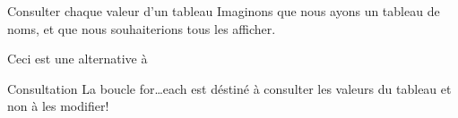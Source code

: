\begin{frame}{Consulter chaque valeur d'un tableau}
    Imaginons que nous ayons un tableau de noms, et que nous souhaiterions tous les afficher.
    
    Ceci est une alternative à
    
    \begin{alertblock}{Consultation}
        La boucle for\ldots each est déstiné à consulter les valeurs du tableau et non à les modifier!
    \end{alertblock}
\end{frame}